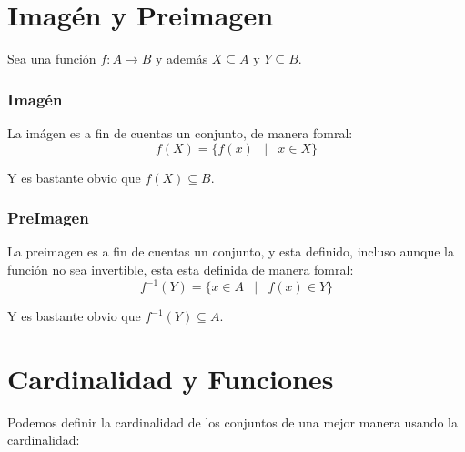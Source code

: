 \documentclass[12pt]{report}                                    %
\DeclareMathOperator \Space {\quad}                             %
\DeclareMathOperator \MiniSpace {\;}                            %
\newcommand \Such {\MiniSpace|\MiniSpace}                       %
\begin{document}
        \clearpage
        \section{Imagén y Preimagen}

            Sea una función $f : A \to B$ y además $X \subseteq A$ y $Y \subseteq B$.  

            \subsubsection{Imagén}
                La imágen es a fin de cuentas un conjunto, de manera fomral:
                \begin{equation} 
                    f(X) = \{ f(x) \Such x \in X \} 
                \end{equation} 

                Y es bastante obvio que $f(X) \subseteq B$.

            \subsubsection{PreImagen}
                La preimagen es a fin de cuentas un conjunto, y esta definido,
                incluso aunque la función no sea invertible, esta esta definida
                de manera fomral:
                \begin{equation} 
                    f^{-1}(Y) = \{ x \in A \Such f(x) \in Y \} 
                \end{equation} 

                Y es bastante obvio que $f^{-1}(Y) \subseteq A$.





        \clearpage
        \section{Cardinalidad y Funciones}

            Podemos definir la cardinalidad de los conjuntos de una mejor manera
            usando la cardinalidad:
\end{document}
